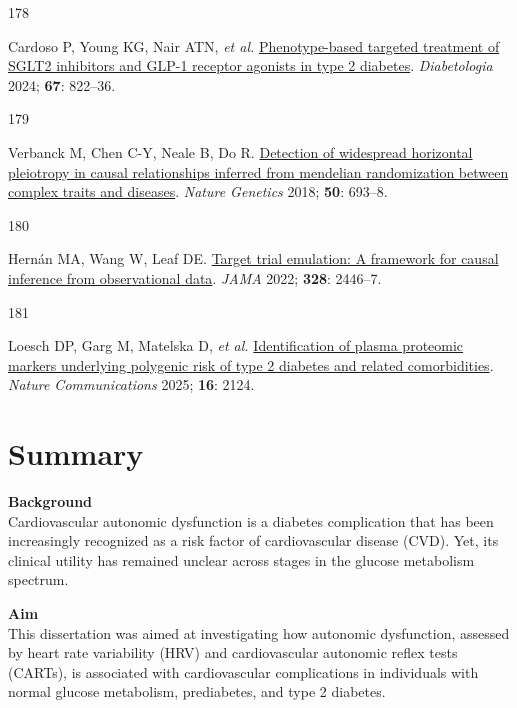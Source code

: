 \documentclass[
  a4paper,
  headsepline=true,
  open=left]{scrbook}
\newlength{\cslhangindent}
\newlength{\csllabelwidth}
\newlength{\cslentryspacingunit} %
\newenvironment{CSLReferences}[2] %
 {%
  \setlength{\parindent}{0pt}
  \ifodd #1
  \let\oldpar\par
  \def\par{\hangindent=\cslhangindent\oldpar}
  \fi
  \setlength{\parskip}{#2\cslentryspacingunit}
 }%
 {}
\newcommand{\CSLLeftMargin}[1]{\parbox[t]{\csllabelwidth}{#1}}
\newcommand{\CSLRightInline}[1]{\parbox[t]{\linewidth - \csllabelwidth}{#1}\break}
\begin{document}
\begin{CSLReferences}{0}{0}
\leavevmode{}%
\CSLLeftMargin{178 }%
\CSLRightInline{Cardoso P, Young KG, Nair ATN, \emph{et al.}
\href{https://doi.org/10.1007/s00125-024-06099-3}{Phenotype-based
targeted treatment of SGLT2 inhibitors and GLP-1 receptor agonists in
type 2 diabetes}. \emph{Diabetologia} 2024; \textbf{67}: 822--36.}

\leavevmode{}%
\CSLLeftMargin{179 }%
\CSLRightInline{Verbanck M, Chen C-Y, Neale B, Do R.
\href{https://doi.org/10.1038/s41588-018-0099-7}{Detection of widespread
horizontal pleiotropy in causal relationships inferred from mendelian
randomization between complex traits and diseases}. \emph{Nature
Genetics} 2018; \textbf{50}: 693--8.}

\leavevmode{}%
\CSLLeftMargin{180 }%
\CSLRightInline{Hernán MA, Wang W, Leaf DE.
\href{https://doi.org/10.1001/jama.2022.21383}{Target trial emulation: A
framework for causal inference from observational data}. \emph{JAMA}
2022; \textbf{328}: 2446--7.}

\leavevmode{}%
\CSLLeftMargin{181 }%
\CSLRightInline{Loesch DP, Garg M, Matelska D, \emph{et al.}
\href{https://doi.org/10.1038/s41467-025-56695-z}{Identification of
plasma proteomic markers underlying polygenic risk of type 2 diabetes
and related comorbidities}. \emph{Nature Communications} 2025;
\textbf{16}: 2124.}

\end{CSLReferences}


\hypertarget{summary}{%
\chapter*{Summary}\label{summary}}


\clearpage
\null
\thispagestyle{empty}
\clearpage

\textbf{Background}\\
Cardiovascular autonomic dysfunction is a diabetes complication that has
been increasingly recognized as a risk factor of cardiovascular disease
(CVD). Yet, its clinical utility has remained unclear across stages in
the glucose metabolism spectrum.

\textbf{Aim}\\
This dissertation was aimed at investigating how autonomic dysfunction,
assessed by heart rate variability (HRV) and cardiovascular autonomic
reflex tests (CARTs), is associated with cardiovascular complications in
individuals with normal glucose metabolism, prediabetes, and type 2
diabetes.
\end{document}
